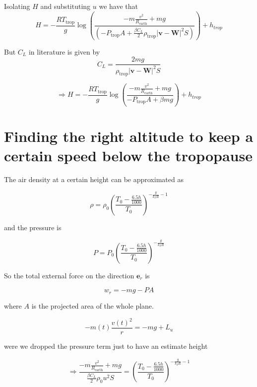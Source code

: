\documentclass{article}
\renewcommand{\vec}[1]{\boldsymbol{#1}}
\begin{document}
Isolating $H$ and substituting $u$ we have that
\begin{equation}
    H= - \frac{RT_{\text{trop}}}{g}\log \left(\frac{-m\frac{v^2}{R_{\text{earth}}} +mg}{\left(-  P_{\text{trop}}A +\frac{\beta C_L}{2} \rho_{\text{trop}} |\vec v-\vec W|^2S\right)}\right)+h_{trop}
\end{equation}

 But $C_L$ in literature is given by
\begin{equation}
    C_L= \frac{2mg}{\rho_{\text{trop}} |\vec v-\vec W|^2S}
\end{equation}

\begin{equation}
    \Rightarrow H= - \frac{RT_{\text{trop}}}{g}\log \left(\frac{-m\frac{v^2}{R_{\text{earth}}} +mg}{-  P_{\text{trop}}A +\beta mg }\right)+h_{trop}
\end{equation}

\section{Finding the right altitude to keep a certain speed below the tropopause}

The air density at a certain height can be approximated as

\begin{equation}
    \rho= \rho_0 \left(\frac{T_0-\frac{6.5h}{1000}}{T_0}\right)^{-\frac{g}{k_TR}-1}
\end{equation}

and the pressure is 

\begin{equation}
    P=P_0\left(\frac{T_0-\frac{6.5h}{1000}}{T_0}\right)^{-\frac{g}{k_TR}}
\end{equation}

So the total external force on the direction $\vec{e}_r$ is 

\begin{equation}
    w_r=-mg -PA 
\end{equation}

where $A$ is the projected area of the whole plane.

\begin{equation}
    -m(t)\frac{v(t)^2}{r}=-mg+ L_u
\end{equation}

were we dropped the pressure term just to have an estimate height

\begin{equation}
  \Rightarrow \frac{-m\frac{v^2}{R_{\text{earth}}} +mg}{\frac{\beta C_L}{2} \rho_0 u^2S}=  \left(\frac{T_0-\frac{6.5h}{1000}}{T_0}\right)^{-\frac{g}{k_TR}-1}    
\end{equation}

\printbibliography
\end{document}
